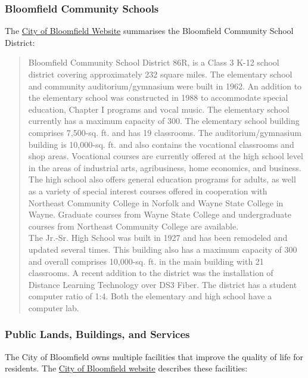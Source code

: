 \subsubsection*{Bloomfield Community Schools}

\noindent The \href{https://bloomfieldnebraska.com/education/}{City of Bloomfield Website} summarises the Bloomfield Community School District:

\begin{quote}
    Bloomfield Community School District 86R, is a Class 3 K-12 school district covering approximately 232 square miles. The elementary school and community auditorium/gymnasium were built in 1962. An addition to the elementary school was constructed in 1988 to accommodate special education, Chapter I programs and vocal music. The elementary school currently has a maximum capacity of 300. The elementary school building comprises 7,500-sq. ft. and has 19 classrooms. The auditorium/gymnasium building is 10,000-sq. ft. and also contains the vocational classrooms and shop areas. Vocational courses are currently offered at the high school level in the areas of industrial arts, agribusiness, home economics, and business. The high school also offers general education programs for adults, as well as a variety of special interest courses offered in cooperation with Northeast Community College in Norfolk and Wayne State College in Wayne. Graduate courses from Wayne State College and undergraduate courses from Northeast Community College are available.\\

    The Jr.-Sr. High School was built in 1927 and has been remodeled and updated several times. This building also has a maximum capacity of 300 and overall comprises 10,000-sq. ft. in the main building with 21 classrooms. A recent addition to the district was the installation of Distance Learning Technology over DS3 Fiber. The district has a student computer ratio of 1:4. Both the elementary and high school have a computer lab.
\end{quote}

\pagebreak
\subsubsection*{Public Lands, Buildings, and Services}

\noindent The City of Bloomfield owns multiple facilities that improve the quality of life for residents. The \href{https://bloomfieldnebraska.com/our-community/}{City of Bloomfield website} describes these facilities:

